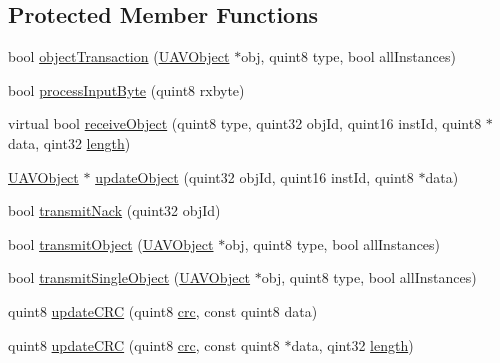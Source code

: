 \subsection*{\-Protected \-Member \-Functions}
\begin{DoxyCompactItemize}
\item 
bool \hyperlink{group___u_a_v_talk_plugin_gaf41ae2b1b8730f18bc3992d6777c0627}{object\-Transaction} (\hyperlink{class_u_a_v_object}{\-U\-A\-V\-Object} $\ast$obj, quint8 type, bool all\-Instances)
\item 
bool \hyperlink{group___u_a_v_talk_plugin_ga39bcb007900ed377097079d21ffe3a68}{process\-Input\-Byte} (quint8 rxbyte)
\item 
virtual bool \hyperlink{group___u_a_v_talk_plugin_gaa95319b62b2b1a92e3f0ef753a1c04a3}{receive\-Object} (quint8 type, quint32 obj\-Id, quint16 inst\-Id, quint8 $\ast$data, qint32 \hyperlink{uavobjecttemplate_8m_a076bf56c9bafa07f3dbda4901a40d84c}{length})
\item 
\hyperlink{class_u_a_v_object}{\-U\-A\-V\-Object} $\ast$ \hyperlink{group___u_a_v_talk_plugin_ga06d53e41c45734baa38c0eb08d684af8}{update\-Object} (quint32 obj\-Id, quint16 inst\-Id, quint8 $\ast$data)
\item 
bool \hyperlink{group___u_a_v_talk_plugin_ga1ea574fb7b47dc949201d4c29b834208}{transmit\-Nack} (quint32 obj\-Id)
\item 
bool \hyperlink{group___u_a_v_talk_plugin_ga81519c2c45745383850ccec92be1eb6a}{transmit\-Object} (\hyperlink{class_u_a_v_object}{\-U\-A\-V\-Object} $\ast$obj, quint8 type, bool all\-Instances)
\item 
bool \hyperlink{group___u_a_v_talk_plugin_ga474ec2f43670acca29d18ad9965b0440}{transmit\-Single\-Object} (\hyperlink{class_u_a_v_object}{\-U\-A\-V\-Object} $\ast$obj, quint8 type, bool all\-Instances)
\item 
quint8 \hyperlink{group___u_a_v_talk_plugin_gae15db61cd3e3604aad8fbd52ddc68fff}{update\-C\-R\-C} (quint8 \hyperlink{uavobjecttemplate_8m_a6a3730e10b2455e9a8b6599785809fce}{crc}, const quint8 data)
\item 
quint8 \hyperlink{group___u_a_v_talk_plugin_gadefd185fb8609e37990694d45282ecd4}{update\-C\-R\-C} (quint8 \hyperlink{uavobjecttemplate_8m_a6a3730e10b2455e9a8b6599785809fce}{crc}, const quint8 $\ast$data, qint32 \hyperlink{uavobjecttemplate_8m_a076bf56c9bafa07f3dbda4901a40d84c}{length})
\end{DoxyCompactItemize}
